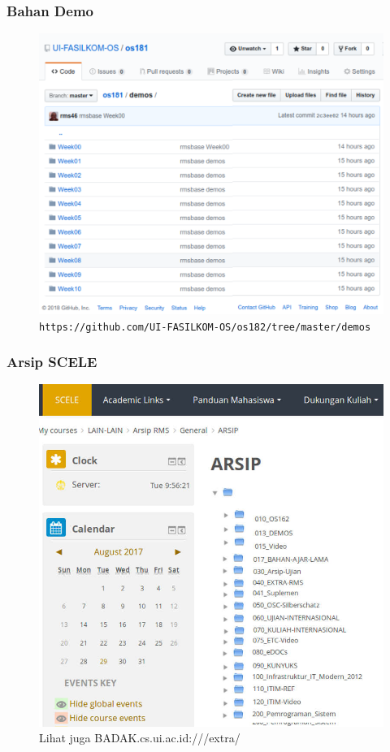 \documentclass[xcolor=table, notheorems, hyperref={pdfpagelabels=false}]{beamer}
\begin{document}
\begin{frame}
\frametitle{Bahan Demo}
\begin{figure}
\includegraphics[width=0.73\linewidth]{os00-github-demo}
\caption{\texttt{https://github.com/UI-FASILKOM-OS/os182/tree/master/demos}}
\end{figure}
\end{frame}


\begin{frame}
\frametitle{Arsip SCELE}
\begin{figure}
\includegraphics[width=0.60\linewidth]{os00-arsip-scele}
\caption{Lihat juga BADAK.cs.ui.ac.id:///extra/}
\end{figure}
\end{frame}

\end{document}
